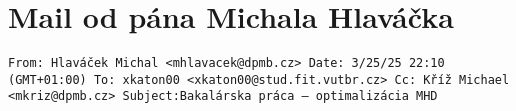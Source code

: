 




\chapter{Mail od pána Michala Hlaváčka}\label{prilohy_mail_hlavacek}
\noindent \texttt{From: Hlaváček Michal <mhlavacek@dpmb.cz> \newline
    Date: 3/25/25 22:10 (GMT+01:00) \newline
    To: xkaton00 <xkaton00@stud.fit.vutbr.cz> \newline
    Cc: Kříž Michael <mkriz@dpmb.cz> \newline
    Subject:\@ Bakalárska práca --- optimalizácia MHD
}

